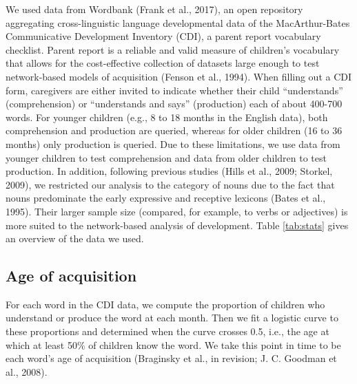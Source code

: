 \documentclass[english,floatsintext,man]{apa6}
\theoremstyle{definition}
\theoremstyle{definition}
\theoremstyle{definition}
\theoremstyle{remark}
\begin{document}
We used data from Wordbank (Frank et al., 2017), an open repository
aggregating cross-linguistic language developmental data of the
MacArthur-Bates Communicative Development Inventory (CDI), a parent
report vocabulary checklist. Parent report is a reliable and valid
measure of children's vocabulary that allows for the cost-effective
collection of datasets large enough to test network-based models of
acquisition (Fenson et al., 1994). When filling out a CDI form,
caregivers are either invited to indicate whether their child
\enquote{understands} (comprehension) or \enquote{understands and says}
(production) each of about 400-700 words. For younger children (e.g., 8
to 18 months in the English data), both comprehension and production are
queried, whereas for older children (16 to 36 months) only production is
queried. Due to these limitations, we use data from younger children to
test comprehension and data from older children to test production. In
addition, following previous studies (Hills et al., 2009; Storkel,
2009), we restricted our analysis to the category of nouns due to the
fact that nouns predominate the early expressive and receptive lexicons
(Bates et al., 1995). Their larger sample size (compared, for example,
to verbs or adjectives) is more suited to the network-based analysis of
development. Table \ref{tab:stats} gives an overview of the data we
used.

\subsection{Age of acquisition}\label{age-of-acquisition}

For each word in the CDI data, we compute the proportion of children who
understand or produce the word at each month. Then we fit a logistic
curve to these proportions and determined when the curve crosses 0.5,
i.e., the age at which at least 50\% of children know the word. We take
this point in time to be each word's age of acquisition (Braginsky et
al., in revision; J. C. Goodman et al., 2008).
\end{document}
